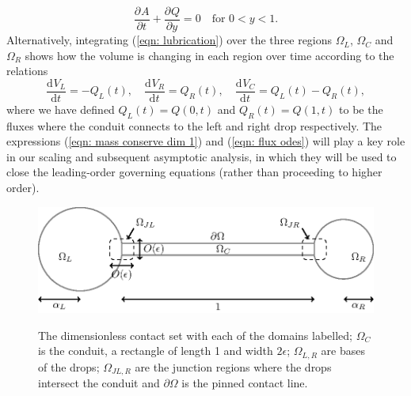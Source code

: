 \documentclass{jfm}
\newcommand{\D}[3]{\frac{ \text{d}^{#3} {#1} }{ \text{d} {#2}^{#3} }}
\newcommand{\pD}[3]{\frac{ \partial^{#3} {#1} }{ \partial {#2}^{#3} }}
\begin{document}
\begin{equation}
\pD{{A}}{{t}}{} + \pD{{Q}}{{y}}{}=0\quad \text{for $0<{y}<1$.} \label{eqn: mass conserve dim 1}
\end{equation}
Alternatively,  integrating (\ref{eqn: lubrication})   over the three regions $\Omega_L$, $\Omega_C$ and $\Omega_R$ shows how the volume is changing in each region over time according to the relations
 \label{eqn: flux odes}  %
\begin{equation}
\D{{V_L}}{{t}}{}  = -{Q_L}({t}), 
\quad  \D{{V_R}}{{t}}{} =   {Q_R}({t}),
\quad  \D{{V_C}}{{t}}{}  = {Q_L}({t})-{Q_R}({t}), \tag{\theequation a--c} 
\end{equation} 
where we have defined $Q_L(t) =  Q(0,t)$ and $Q_R(t) =  Q(1,t)$ to be the fluxes where the  conduit  connects to the left and right drop respectively.
The   expressions (\ref{eqn: mass conserve dim 1})  and (\ref{eqn: flux odes})     will play a key role in our scaling and subsequent asymptotic analysis, in which they will be used to close the leading-order governing equations (rather than proceeding to higher order).

\begin{figure} 
\centering
 {\includegraphics[width=0.8\linewidth]{Figures/Dumbbell_Dimensionless.eps}}  
  \caption{ 
  The dimensionless contact set with each of the  domains labelled; $\Omega_C$ is the conduit, a rectangle of length 1 and width $2 \epsilon$; $\Omega_{L,R}$ are bases of the drops; $\Omega_{JL,R}$ are the junction regions where the drops intersect the conduit and $\partial \Omega$ is the pinned contact line. 
} \label{fig: geometry, dimensionless}
\end{figure}
\end{document}
